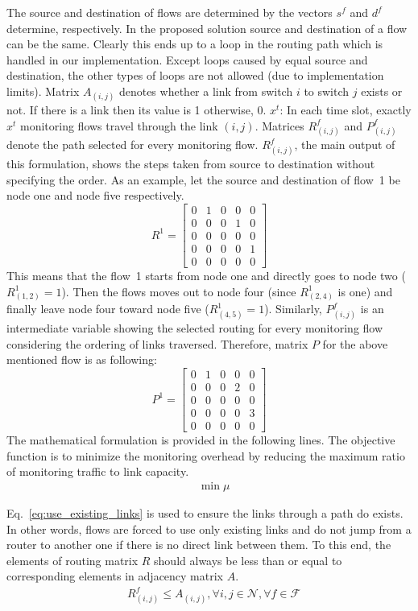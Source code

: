 \documentclass[10pt, journal, letterpaper]{IEEEtran}
\begin{document}
The source and destination of flows are determined by the vectors $s^f$ and $d^f$ determine, respectively. In the proposed solution source and destination of a flow can be the same. Clearly this ends up to a loop in the routing path which is handled in our implementation. Except loops caused by equal source and destination, the other types of loops are not allowed (due to implementation limits). Matrix $A_{(i,j)}$ denotes whether a link from switch $i$ to switch $j$ exists or not. If there is a link then its value is 1 otherwise, 0. $x^t$: In each time slot, exactly $x^t$ monitoring flows travel through the link $(i,j)$. Matrices $R^f_{(i,j)}$ and $P^f_{(i,j)}$ denote the path selected for every monitoring flow. $R^f_{(i,j)}$, the main output of this formulation, shows the steps taken from source to destination without specifying the order. As an example, let the source and destination of flow~1 be node one and node five respectively. 
\[R^1=
  \begin{bmatrix}
    0 & 1 & 0 & 0 & 0\\
    0 & 0 & 0 & 1 & 0\\
    0 & 0 & 0 & 0 & 0\\
    0 & 0 & 0 & 0 & 1\\
    0 & 0 & 0 & 0 & 0
  \end{bmatrix}\]
This means that the flow~1 starts from node one and directly goes to node two ($R^1_{(1,2)}=1$). Then the flows moves out to node four (since $R^1_{(2,4)}$ is one) and finally leave node four toward node five ($R^1_{(4,5)}=1$). Similarly, $P^f_{(i,j)}$ is an intermediate variable showing the selected routing for every monitoring flow considering the ordering of links traversed. Therefore, matrix $P$ for the above mentioned flow is as following:
\[P^1=
  \begin{bmatrix}
    0 & 1 & 0 & 0 & 0\\
    0 & 0 & 0 & 2 & 0\\
    0 & 0 & 0 & 0 & 0\\
    0 & 0 & 0 & 0 & 3\\
    0 & 0 & 0 & 0 & 0
  \end{bmatrix}\]
The mathematical formulation is provided in the following lines. The objective function is to minimize the monitoring overhead by reducing the maximum ratio of monitoring traffic to link capacity.
\begin{align}
    & \min{\mu}
\end{align}

Eq.~\ref{eq:use_existing_links} is used to ensure the links through a path do exists. In other words, flows are forced to use only existing links and do not jump from a router to another one if there is no direct link between them. To this end, the elements of routing matrix $R$ should always be less than or equal to corresponding elements in adjacency matrix $A$.
\begin{align}
    & R_{(i,j)}^f \leq A_{(i,j)}, \forall i, j \in \mathcal{N}, \forall f \in \mathcal{F} \label{eq:use_existing_links}
\end{align}
\end{document}
